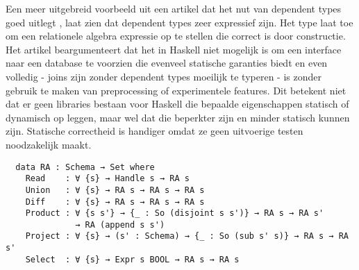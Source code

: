 Een meer uitgebreid voorbeeld uit een artikel dat het nut van dependent types
goed uitlegt \cite{TPoP}, laat zien dat dependent types zeer expressief zijn.
Het type  laat toe om een relationele algebra expressie op te stellen
die correct is door constructie. Het artikel beargumenteert dat het in Haskell
niet mogelijk is om een interface naar een database te voorzien die evenveel
statische garanties biedt en even volledig - joins zijn zonder dependent types
moeilijk te typeren - is zonder gebruik te maken van preprocessing of
experimentele features. Dit betekent niet dat er geen libraries bestaan voor
Haskell die bepaalde eigenschappen statisch of dynamisch op leggen, maar wel
dat die beperkter zijn en minder statisch kunnen zijn. Statische correctheid is
handiger omdat ze geen uitvoerige testen noodzakelijk maakt.

\begin{verbatim}
  data RA : Schema → Set where
    Read    : ∀ {s} → Handle s → RA s
    Union   : ∀ {s} → RA s → RA s → RA s
    Diff    : ∀ {s} → RA s → RA s → RA s
    Product : ∀ {s s'} → {_ : So (disjoint s s')} → RA s → RA s'
              → RA (append s s')
    Project : ∀ {s} → (s' : Schema) → {_ : So (sub s' s)} → RA s → RA s'
    Select  : ∀ {s} → Expr s BOOL → RA s → RA s
\end{verbatim}


